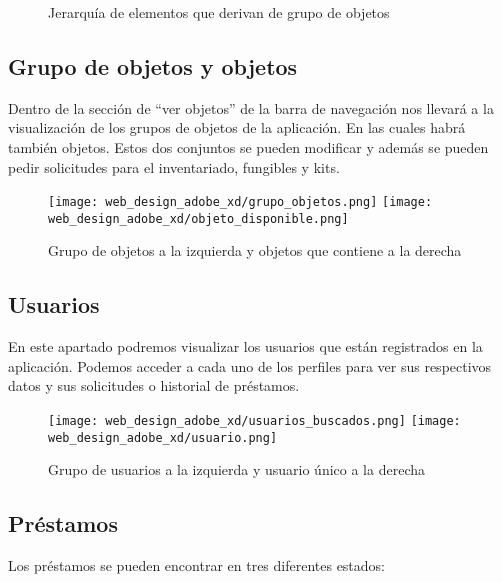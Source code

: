 \begin{figure}
    \caption{Jerarquía de elementos que derivan de grupo de objetos}
\end{figure}

\subsection{Grupo de objetos y objetos}

Dentro de la sección de ``ver objetos'' de la barra de navegación nos llevará a la visualización de los grupos de objetos de la aplicación. En las cuales habrá también objetos. Estos dos conjuntos se pueden modificar y además se pueden pedir solicitudes para el inventariado, fungibles y kits.

\begin{figure}
    \begin{center}
        \texttt{[image: web\_design\_adobe\_xd/grupo\_objetos.png]}
        \texttt{[image: web\_design\_adobe\_xd/objeto\_disponible.png]}
        \caption{Grupo de objetos a la izquierda y objetos que contiene a la derecha}
    \end{center}
\end{figure}

\subsection{Usuarios}

En este apartado podremos visualizar los usuarios que están registrados en la aplicación. Podemos acceder a cada uno de los perfiles para ver sus respectivos datos y sus solicitudes o historial de préstamos.

\begin{figure}
    \begin{center}
        \texttt{[image: web\_design\_adobe\_xd/usuarios\_buscados.png]}
        \texttt{[image: web\_design\_adobe\_xd/usuario.png]}
        \caption{Grupo de usuarios a la izquierda y usuario único a la derecha}
    \end{center}
\end{figure}

\subsection{Préstamos}

Los préstamos se pueden encontrar en tres diferentes estados:

